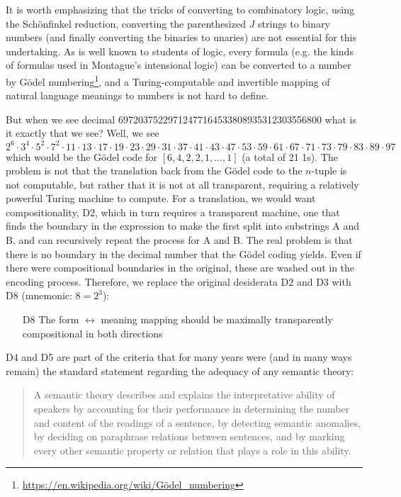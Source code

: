 \documentclass[output=paper,colorlinks=true,citecolor=brown]{langscibook}
\begin{document}
It is worth emphasizing that the tricks of converting to combinatory logic,
using the Schönfinkel reduction, converting the parenthesized $J$ strings to
binary numbers (and finally converting the binaries to unaries) are not
essential for this undertaking. As is well known to students of logic, every
formula (e.g. the kinds of formulas used in Montague's intensional logic) can
be converted to a number by
Gödel numbering\footnote{\url{https://en.wikipedia.org/wiki/Gödel_numbering}}, and a
Turing-computable and invertible mapping of natural language meanings to
numbers is not hard to define.

But when we see decimal 69720375229712477164533808935312303556800 what is it
exactly that we see? Well, we see $2^6\cdot 3^4\cdot 5^2\cdot 7^2\cdot 11\cdot
13\cdot 17\cdot 19\cdot 23\cdot 29\cdot 31\cdot 37\cdot 41\cdot 43\cdot
47\cdot 53\cdot 59\cdot 61\cdot 67\cdot 71\cdot 73\cdot 79\cdot 83\cdot
89\cdot 97$ which would be the Gödel code for $[6,4,2,2,1,...,1]$ (a
total of 21 1s). The problem is not that the translation back from the Gödel
code to the $n$-tuple is not computable, but rather that it is not at all
transparent, requiring a relatively powerful Turing machine to compute. For a
translation, we would want compositionality, D2, which in turn requires a
transparent machine, one that finds the boundary in the expression to make the
first split into substrings A and B, and can recursively repeat the process
for A and B. The real problem is that there is no boundary in the decimal
number that the Gödel coding yields. Even if there were compositional
boundaries in the original, these are washed out in the encoding process.
Therefore, we replace the original desiderata D2 and D3 with D8 (mnemonic:
$8=2^3$):

\begin{itemize}
\item[D8] The form $\leftrightarrow$ meaning mapping should be maximally
  transparently compositional in both directions
\end{itemize}

D4 and D5 are part of the \citet{Katz:1963} criteria that
for many years were (and in many ways remain) the standard statement regarding
the adequacy of any semantic theory:

\begin{quote}
A semantic theory describes and explains the interpretative ability of
speakers by accounting for their performance in determining the number and
content of the readings of a sentence, by detecting semantic anomalies, by
deciding on paraphrase relations between sentences, and by marking every other
semantic property or relation that plays a role in this ability.
\end{quote}
\end{document}
